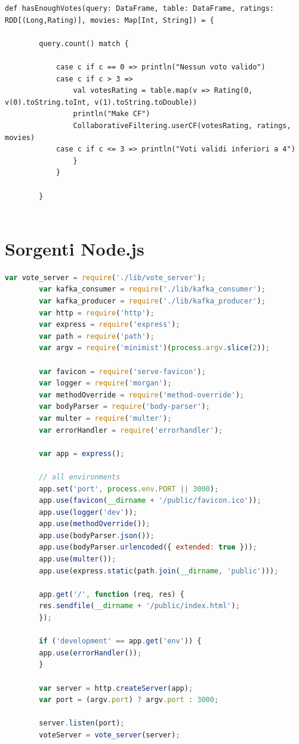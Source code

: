 \documentclass[11pt]{article}
\begin{document}
\begin{appendices}
\begin{lstlisting}[style=scalacode, caption=CEP.scala]
		def hasEnoughVotes(query: DataFrame, table: DataFrame, ratings: RDD[(Long,Rating)], movies: Map[Int, String]) = {
		
		query.count() match {
		
			case c if c == 0 => println("Nessun voto valido")
			case c if c > 3 =>
				val votesRating = table.map(v => Rating(0, v(0).toString.toInt, v(1).toString.toDouble))
				println("Make CF")
				CollaborativeFiltering.userCF(votesRating, ratings, movies)
			case c if c <= 3 => println("Voti validi inferiori a 4")
				}
			}
		
		}
		
	\end{lstlisting}
	\section{Sorgenti Node.js}
	
	\begin{lstlisting}[language=Javascript, caption=app.js]
		var vote_server = require('./lib/vote_server');
		var kafka_consumer = require('./lib/kafka_consumer');
		var kafka_producer = require('./lib/kafka_producer');
		var http = require('http');
		var express = require('express');
		var path = require('path');
		var argv = require('minimist')(process.argv.slice(2));
		
		var favicon = require('serve-favicon');
		var logger = require('morgan');
		var methodOverride = require('method-override');
		var bodyParser = require('body-parser');
		var multer = require('multer');
		var errorHandler = require('errorhandler');
		
		var app = express();
		
		// all environments
		app.set('port', process.env.PORT || 3000);
		app.use(favicon(__dirname + '/public/favicon.ico'));
		app.use(logger('dev'));
		app.use(methodOverride());
		app.use(bodyParser.json());
		app.use(bodyParser.urlencoded({ extended: true }));
		app.use(multer());
		app.use(express.static(path.join(__dirname, 'public')));
		
		app.get('/', function (req, res) {
		res.sendfile(__dirname + '/public/index.html');
		});
		
		if ('development' == app.get('env')) {
		app.use(errorHandler());
		}
		
		var server = http.createServer(app);
		var port = (argv.port) ? argv.port : 3000;
		
		server.listen(port);
		voteServer = vote_server(server);
		

\end{lstlisting}
\end{appendices}
\end{document}
